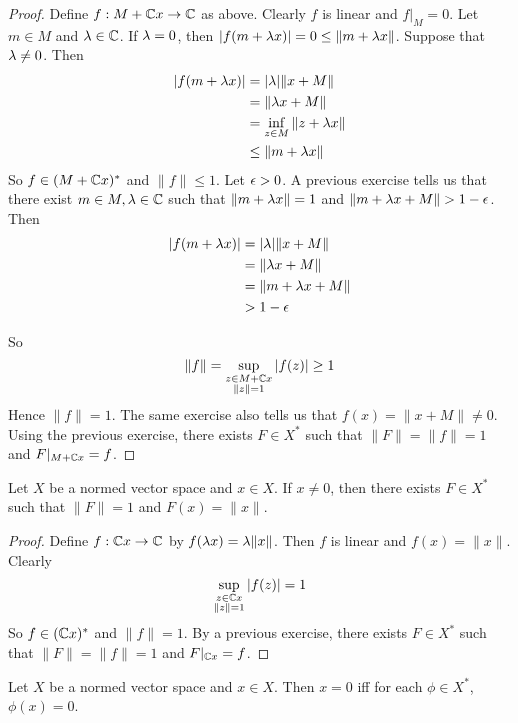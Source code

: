 \documentclass{book}
\begin{document}
	\begin{proof}
		Define $f:M+\mathbb{C} x \rightarrow \mathbb{C}$ as above. Clearly $f$ is linear and $f|_M = 0$. Let $m \in M$ and $\lambda \in \mathbb{C}$. If $\lambda = 0$, then $\vert f(m +\lambda x) \vert = 0 \leq \|m+ \lambda x \|$. Suppose that $\lambda \neq 0$. Then 
		\begin{align*}
			\vert f(m+\lambda x) \vert 
			& = \vert \lambda \vert \|x+M \|\\
			& =  \|\lambda x+M \|\\
			& = \inf_{z \in M} \|z+ \lambda x \|\\
			& \leq  \|m+ \lambda x  \|\\
		\end{align*} 
		So $f \in (M+\mathbb{C} x )^*$ and $\|f \|\leq 1$. Let $\epsilon >0$. A previous exercise tells us that there exist $m \in M, \lambda \in \mathbb{C}$ such that $\|m+ \lambda x \|= 1$ and $\|m+ \lam x +M \|> 1- \ep$. Then 
		\begin{align*}
			\vert f(m + \lambda x) \vert
			&= \vert \lambda \vert \|x+M\|\\
			&=\|\lambda x +M \|\\
			&= \|m + \lambda x +M \|\\
			&> 1-\epsilon
		\end{align*}
		
		So $$ \|f \|= \sup_{\substack{z \in M + \mathbb{C} x \\ \|z \|=1}} \vert f(z) \vert \geq 1$$ Hence $\|f \|=1$. 
		The same exercise also tells us that $f(x) = \|x+M\|\neq 0$. Using the previous exercise, there exists $F \in X^*$ such that $\|F \|= \|f \|= 1$ and $F|_{M+\mathbb{C} x} = f$.
	\end{proof}
	
	\begin{ex} 
		Let $X$ be a normed vector space and $x \in X$. If $x \neq 0$, then there exists $F \in X^*$ such that $\|F \|= 1$ and $F(x) = \|x \|$.
	\end{ex}
	
	\begin{proof}
		Define $f:\mathbb{C} x \rightarrow \mathbb{C}$ by $f(\lambda x) = \lambda \|x \|$. Then $f$ is linear and $f(x) = \|x \|$. Clearly $$\sup_{\substack{z \in \mathbb{C} x \\ \|z \|=1}}\vert f(z) \vert = 1$$ 
		So $f \in (\mathbb{C} x)^*$ and $\|f \|= 1$. By a previous exercise, there exists $F \in X^*$ such that $\|F \|= \|f \|=1$ and $F|_{\mathbb{C} x} = f$. 
	\end{proof}
	
	\begin{ex} 
	Let $X$ be a normed vector space and $x \in X$. Then $x = 0$ iff for each $\phi \in X^*$, $\phi(x) = 0$.
	\end{ex}
	
\end{document}
